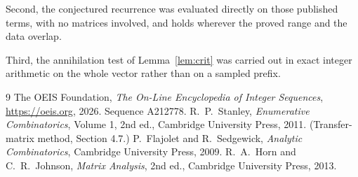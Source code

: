 \documentclass[11pt,a4paper]{article}
\theoremstyle{plain}
\theoremstyle{definition}
\begin{document}
Second, the conjectured recurrence was evaluated directly on those published terms, with no
matrices involved, and holds wherever the proved range and the data overlap.

Third, the annihilation test of Lemma~\ref{lem:crit} was carried out in exact integer
arithmetic on the whole vector rather than on a sampled prefix.

\begin{thebibliography}{9}
 The OEIS Foundation, \emph{The On-Line Encyclopedia of Integer
Sequences}, \url{https://oeis.org}, 2026. Sequence A212778.
 R.~P.~Stanley, \emph{Enumerative Combinatorics}, Volume 1, 2nd ed.,
Cambridge University Press, 2011. (Transfer-matrix method, Section 4.7.)
 P.~Flajolet and R.~Sedgewick, \emph{Analytic Combinatorics}, Cambridge
University Press, 2009.
 R.~A.~Horn and C.~R.~Johnson, \emph{Matrix Analysis}, 2nd ed., Cambridge
University Press, 2013.
\end{thebibliography}
\end{document}

